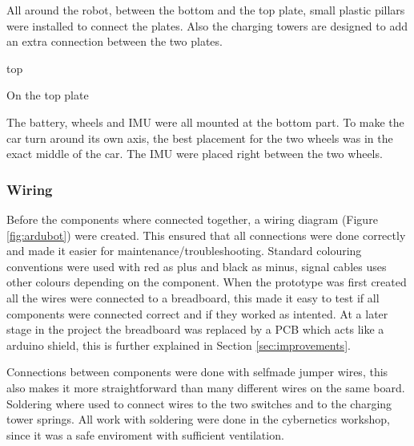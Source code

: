 All around the robot, between the bottom and the top plate, small plastic pillars were installed to connect the plates. Also the charging towers are designed to add an extra connection between the two plates.

top

On the top plate

The battery, wheels and IMU were all mounted at the bottom part. To make the car turn around its own axis, the best placement for the two wheels was in the exact middle of the car. The IMU were placed right between the two wheels. 

\subsubsection{Wiring}
Before the components where connected together, a wiring diagram (Figure \ref{fig:ardubot}) were created. This ensured that all connections were done correctly and made it easier for maintenance/troubleshooting. Standard colouring conventions were used with red as plus and black as minus, signal cables uses other colours depending on the component. When the prototype was first created all the wires were connected to a breadboard, this made it easy to test if all components were connected correct and if they worked as intented. At a later stage in the project the breadboard was replaced by a PCB which acts like a arduino shield, this is further explained in Section \ref{sec:improvements}.

Connections between components were done with selfmade jumper wires, this also makes it more straightforward than many different wires on the same board. Soldering where used to connect wires to the two switches and to the charging tower springs. All work with soldering were done in the cybernetics workshop, since it was a safe enviroment with sufficient ventilation.